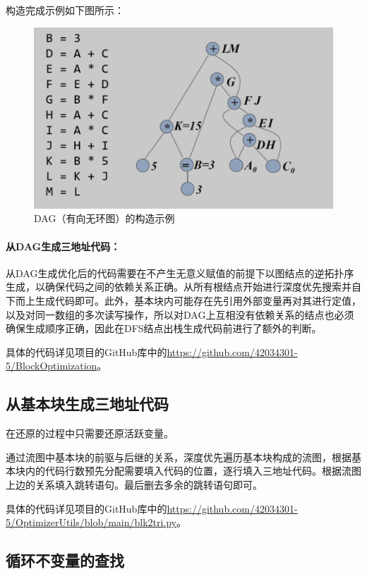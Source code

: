 \documentclass[cn,black,11pt,normal]{elegantnote}
\begin{document}
构造完成示例如下图所示：

\begin{figure}[H]
    \centering
    \includegraphics[width=0.8\linewidth]{image/dagopt1.png}
    \caption{DAG（有向无环图）的构造示例}
\end{figure}

\paragraph{从DAG生成三地址代码：} 从DAG生成优化后的代码需要在不产生无意义赋值的前提下以图结点的逆拓扑序生成，以确保代码之间的依赖关系正确。从所有根结点开始进行深度优先搜索并自下而上生成代码即可。此外，基本块内可能存在先引用外部变量再对其进行定值，以及对同一数组的多次读写操作，所以对DAG上互相没有依赖关系的结点也必须确保生成顺序正确，因此在DFS结点出栈生成代码前进行了额外的判断。


具体的代码详见项目的GitHub库中的\url{https://github.com/42034301-5/BlockOptimization}。

\subsection{从基本块生成三地址代码}

在还原的过程中只需要还原活跃变量。

通过流图中基本块的前驱与后继的关系，深度优先遍历基本块构成的流图，根据基本块内的代码行数预先分配需要填入代码的位置，逐行填入三地址代码。根据流图上边的关系填入跳转语句。最后删去多余的跳转语句即可。

具体的代码详见项目的GitHub库中的\url{https://github.com/42034301-5/OptimizerUtils/blob/main/blk2tri.py}。

\subsection{循环不变量的查找}
\end{document}
